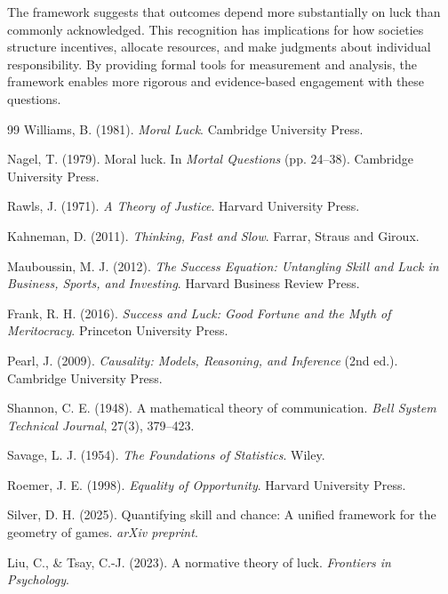   The framework suggests that outcomes depend more substantially on luck
  than commonly acknowledged. This recognition has implications for how societies
  structure incentives, allocate resources, and make judgments about individual
  responsibility. By providing formal tools for measurement and analysis,
  the framework enables more rigorous and evidence-based engagement with
  these questions.


  \begin{thebibliography}{99}
     Williams, B. (1981). \textit{Moral Luck}.
      Cambridge University Press.

     Nagel, T. (1979). Moral luck. In \textit{Mortal
      Questions} (pp. 24--38). Cambridge University Press.

     Rawls, J. (1971). \textit{A Theory of Justice}.
      Harvard University Press.

     Kahneman, D. (2011). \textit{Thinking, Fast and
      Slow}. Farrar, Straus and Giroux.

     Mauboussin, M. J. (2012). \textit{The
      Success Equation: Untangling Skill and Luck in Business, Sports, and
      Investing}. Harvard Business Review Press.

     Frank, R. H. (2016). \textit{Success and Luck: Good
      Fortune and the Myth of Meritocracy}. Princeton University Press.

     Pearl, J. (2009). \textit{Causality: Models,
      Reasoning, and Inference} (2nd ed.). Cambridge University Press.

     Shannon, C. E. (1948). A mathematical theory of
      communication. \textit{Bell System Technical Journal}, 27(3), 379--423.

     Savage, L. J. (1954). \textit{The Foundations
      of Statistics}. Wiley.

     Roemer, J. E. (1998). \textit{Equality of
      Opportunity}. Harvard University Press.

     Silver, D. H. (2025). Quantifying skill and chance:
      A unified framework for the geometry of games. \textit{arXiv preprint}.

     Liu, C., \& Tsay, C.-J. (2023). A normative theory
      of luck. \textit{Frontiers in Psychology}.


\end{thebibliography}
